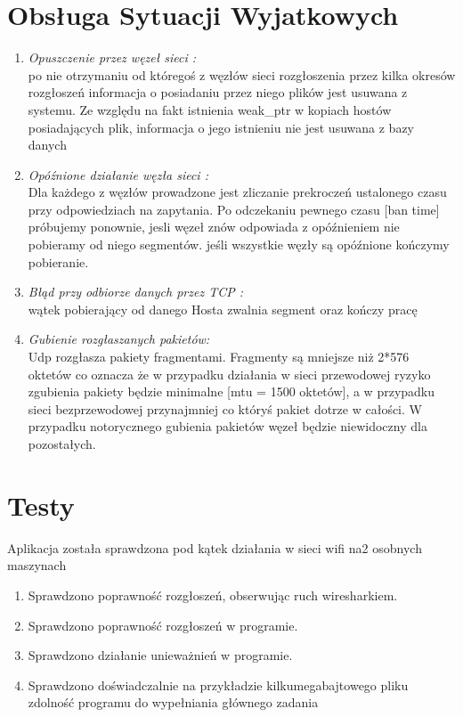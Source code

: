 \documentclass[11pt,oneside]{book}
\newcommand{\+}{\discretionary{\mbox{\scriptsize$\hookleftarrow$}}{}{}}
\begin{document}
\section{Obsługa Sytuacji Wyjatkowych}
\begin{enumerate}
	\item 
	\textit{Opuszczenie przez węzeł sieci :} \\
	po nie otrzymaniu od któregoś z węzłów sieci rozgłoszenia przez kilka okresów rozgłoszeń informacja o posiadaniu przez niego plików jest usuwana z systemu. Ze względu na fakt istnienia weak\_ptr  w kopiach hostów posiadających plik, informacja o jego istnieniu nie jest usuwana z bazy danych
	\item
\textit{	Opóźnione działanie węzła sieci :}\\
	Dla każdego z węzłów prowadzone jest zliczanie prekroczeń ustalonego czasu przy odpowiedziach na zapytania. Po odczekaniu pewnego czasu [ban time] próbujemy ponownie, jesli węzeł znów odpowiada z opóźnieniem nie pobieramy od niego segmentów.
	jeśli wszystkie węzły są opóźnione kończymy pobieranie.
	\item
	\textit{Błąd przy odbiorze danych przez TCP :}\\
	wątek pobierający od danego Hosta zwalnia segment oraz kończy pracę
	\item
\textit{	Gubienie rozgłaszanych pakietów: }\\
	 Udp rozgłasza pakiety fragmentami. Fragmenty są mniejsze niż 2*576 oktetów co oznacza że w przypadku działania w sieci przewodowej ryzyko zgubienia pakiety będzie minimalne [mtu = 1500 oktetów], a w przypadku sieci bezprzewodowej przynajmniej co któryś pakiet dotrze w całości. W przypadku notorycznego gubienia pakietów węzeł będzie niewidoczny dla pozostałych.
	
\end{enumerate}
\section{Testy}
Aplikacja została sprawdzona pod kątek działania w sieci wifi na2 osobnych maszynach
\begin{enumerate}
	\item Sprawdzono poprawność rozgłoszeń, obserwując ruch wiresharkiem.
	\item Sprawdzono poprawność rozgłoszeń w programie.
	\item Sprawdzono działanie unieważnień w programie.
	\item Sprawdzono doświadczalnie na przykładzie kilkumegabajtowego pliku zdolność programu do wypełniania głównego zadania
\end{enumerate}
\end{document}
